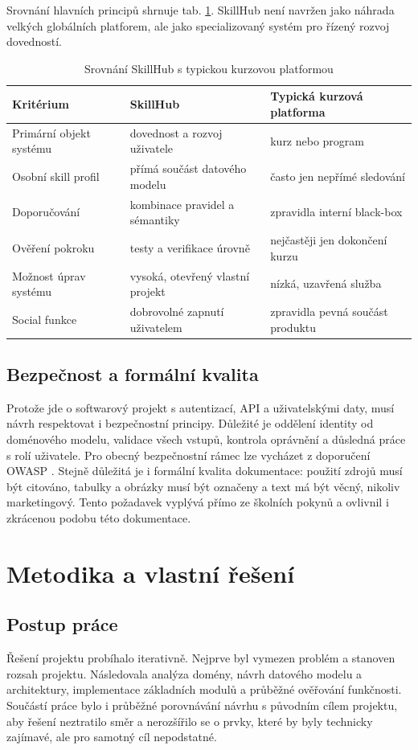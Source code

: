 \documentclass[12pt,a4paper]{report}
\begin{document}
Srovnání hlavních principů shrnuje tab. \ref{tab:comparison}. SkillHub není navržen jako náhrada velkých globálních platforem, ale jako specializovaný systém pro řízený rozvoj dovedností.

\begin{table}[ht]
\centering
\caption{Srovnání SkillHub s typickou kurzovou platformou}
\label{tab:comparison}
\begin{tabularx}{\textwidth}{>{\raggedright\arraybackslash}p{4.2cm} >{\raggedright\arraybackslash}X >{\raggedright\arraybackslash}X}
\toprule
Kritérium & SkillHub & Typická kurzová platforma \\
\midrule
Primární objekt systému & dovednost a rozvoj uživatele & kurz nebo program \\
Osobní skill profil & přímá součást datového modelu & často jen nepřímé sledování \\
Doporučování & kombinace pravidel a sémantiky & zpravidla interní black-box \\
Ověření pokroku & testy a verifikace úrovně & nejčastěji jen dokončení kurzu \\
Možnost úprav systému & vysoká, otevřený vlastní projekt & nízká, uzavřená služba \\
Social funkce & dobrovolné zapnutí uživatelem & zpravidla pevná součást produktu \\
\bottomrule
\end{tabularx}
\end{table}

\section{Bezpečnost a formální kvalita}
Protože jde o softwarový projekt s autentizací, API a uživatelskými daty, musí návrh respektovat i bezpečnostní principy. Důležité je oddělení identity od doménového modelu, validace všech vstupů, kontrola oprávnění a důsledná práce s rolí uživatele. Pro obecný bezpečnostní rámec lze vycházet z doporučení OWASP \cite{owasp}. Stejně důležitá je i formální kvalita dokumentace: použití zdrojů musí být citováno, tabulky a obrázky musí být označeny a text má být věcný, nikoliv marketingový. Tento požadavek vyplývá přímo ze školních pokynů a ovlivnil i zkrácenou podobu této dokumentace.

\chapter{Metodika a vlastní řešení}
\section{Postup práce}
Řešení projektu probíhalo iterativně. Nejprve byl vymezen problém a stanoven rozsah projektu. Následovala analýza domény, návrh datového modelu a architektury, implementace základních modulů a průběžné ověřování funkčnosti. Součástí práce bylo i průběžné porovnávání návrhu s původním cílem projektu, aby řešení neztratilo směr a nerozšířilo se o prvky, které by byly technicky zajímavé, ale pro samotný cíl nepodstatné.
\end{document}
